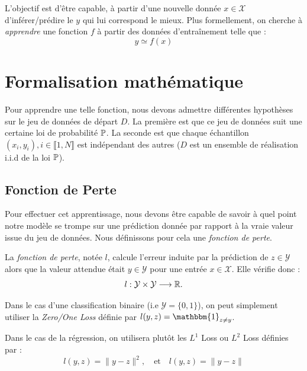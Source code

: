 L'objectif est d'être capable, à partir d'une nouvelle donnée $x \in \mathcal{X}$ d'inférer/prédire le $y$ qui lui correspond le mieux. Plus formellement, on cherche à \emph{apprendre} une fonction $f$ à partir des données d'entraînement telle que : 
\begin{equation}
    y \simeq f(x)
\end{equation}


\section{Formalisation mathématique}

Pour apprendre une telle fonction, nous devons admettre différentes hypothèses sur le jeu de données de départ $D$. La première est que ce jeu de données suit une certaine loi de probabilité $ \mathbb{P}$. La seconde est que chaque échantillon $(x_i, y_i), i \in \llbracket 1, N \rrbracket$ est indépendant des autres ($D$ est un ensemble de réalisation i.i.d de la loi $ \mathbb{P}$). 

\subsection{Fonction de Perte}

Pour effectuer cet apprentissage, nous devons être capable de savoir à quel point notre modèle se trompe sur une prédiction donnée par rapport à la vraie valeur issue du jeu de données. Nous définissons pour cela une \emph{fonction de perte}. 

\begin{definition}
    La \emph{fonction de perte}, notée $l$, calcule l'erreur induite par la prédiction de $z \in \mathcal{Y}$ alors que la valeur attendue était $y \in \mathcal{Y}$ pour une entrée $x \in \mathcal{X}$. Elle vérifie donc : 
    \begin{equation}
        l : \mathcal{Y} \times \mathcal{Y} \longrightarrow \mathbb{R}.
    \end{equation}
\end{definition}

\begin{example}
    Dans le cas d'une classification binaire (i.e $ \mathcal{Y} = \{0, 1\}$), on peut simplement utiliser la \emph{Zero/One Loss} définie par $l(y, z) = \mathbbm{1}_{z \not = y}$. 

    Dans le cas de la régression, on utilisera plutôt les $L^1$ Loss ou $L^2$ Loss définies par : 
    $$ l(y, z) = \|y - z\|^2, \quad \text{et} \quad l(y, z) = \|y - z\|$$ 
\end{example}

